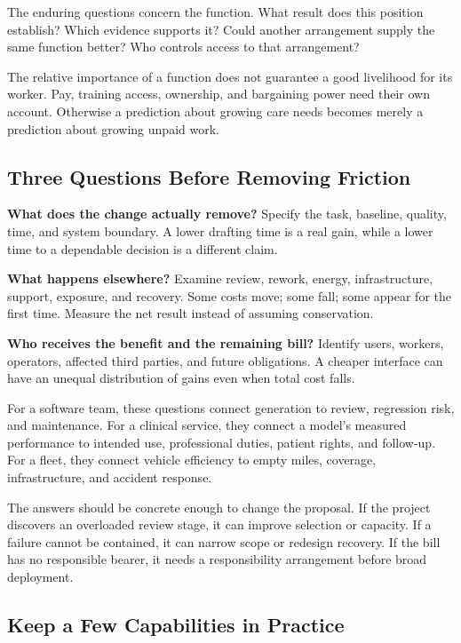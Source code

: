 The enduring questions concern the function. What result does this position establish? Which evidence supports it? Could another arrangement supply the same function better? Who controls access to that arrangement?

The relative importance of a function does not guarantee a good livelihood for its worker. Pay, training access, ownership, and bargaining power need their own account. Otherwise a prediction about growing care needs becomes merely a prediction about growing unpaid work.

\subsection{Three Questions Before Removing Friction}

\textbf{What does the change actually remove?} Specify the task, baseline, quality, time, and system boundary. A lower drafting time is a real gain, while a lower time to a dependable decision is a different claim.

\textbf{What happens elsewhere?} Examine review, rework, energy, infrastructure, support, exposure, and recovery. Some costs move; some fall; some appear for the first time. Measure the net result instead of assuming conservation.

\textbf{Who receives the benefit and the remaining bill?} Identify users, workers, operators, affected third parties, and future obligations. A cheaper interface can have an unequal distribution of gains even when total cost falls.

For a software team, these questions connect generation to review, regression risk, and maintenance. For a clinical service, they connect a model's measured performance to intended use, professional duties, patient rights, and follow-up. For a fleet, they connect vehicle efficiency to empty miles, coverage, infrastructure, and accident response.

The answers should be concrete enough to change the proposal. If the project discovers an overloaded review stage, it can improve selection or capacity. If a failure cannot be contained, it can narrow scope or redesign recovery. If the bill has no responsible bearer, it needs a responsibility arrangement before broad deployment.

\subsection{Keep a Few Capabilities in Practice}

